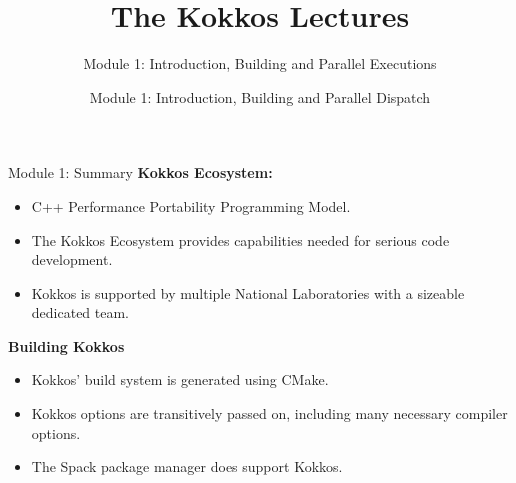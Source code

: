 

\def\sandid{SAND2020-7263 PE}

\title{The Kokkos Lectures}
\subtitle{Module 1: Introduction, Building and Parallel Executions}

\author{Module 1: Introduction, Building and Parallel Dispatch}



\shortfalse
\mediumtrue
\fulltrue
\notoverviewtrue



% 

\begin{frame}
	\titlepage
\end{frame}













\begin{frame}{Module 1: Summary}
	\textbf{Kokkos Ecosystem:}
	\begin{itemize}
		\item C++ Performance Portability Programming Model.
		\item The Kokkos Ecosystem provides capabilities needed for serious code development.
		\item Kokkos is supported by multiple National Laboratories with a sizeable dedicated team.
	\end{itemize}

	\textbf{Building Kokkos}
	\begin{itemize}
    \item{Kokkos' build system is generated using CMake.}
    \item{Kokkos options are transitively passed on, including many necessary compiler options.}
    \item{The Spack package manager does support Kokkos.}
	\end{itemize}
\end{frame}

